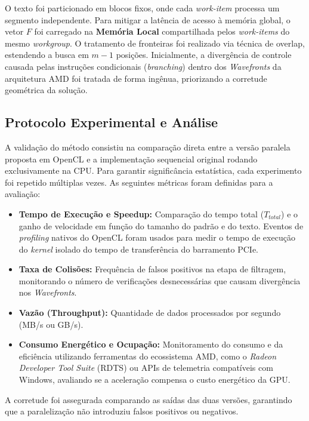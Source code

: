 \documentclass[12pt]{article}
\begin{document}
O texto foi particionado em blocos fixos, onde cada \textit{work-item} processa um segmento independente. Para mitigar a latência de acesso à memória global, o vetor $F$ foi carregado na \textbf{Memória Local} compartilhada pelos \textit{work-items} do mesmo \textit{workgroup}. O tratamento de fronteiras foi realizado via técnica de overlap, estendendo a busca em $m-1$ posições. Inicialmente, a divergência de controle causada pelas instruções condicionais (\textit{branching}) dentro dos \textit{Wavefronts} da arquitetura AMD foi tratada de forma ingênua, priorizando a corretude geométrica da solução.

\subsection{Protocolo Experimental e Análise}

A validação do método consistiu na comparação direta entre a versão paralela proposta em OpenCL e a implementação sequencial original rodando exclusivamente na CPU. Para garantir significância estatística, cada experimento foi repetido múltiplas vezes. As seguintes métricas foram definidas para a avaliação:

\begin{itemize}
    \item \textbf{Tempo de Execução e Speedup:} Comparação do tempo total ($T_{total}$) e o ganho de velocidade em função do tamanho do padrão e do texto. Eventos de \textit{profiling} nativos do OpenCL foram usados para medir o tempo de execução do \textit{kernel} isolado do tempo de transferência do barramento PCIe.
    \item \textbf{Taxa de Colisões:} Frequência de falsos positivos na etapa de filtragem, monitorando o número de verificações desnecessárias que causam divergência nos \textit{Wavefronts}.
    \item \textbf{Vazão (Throughput):} Quantidade de dados processados por segundo (MB/s ou GB/s).
    \item \textbf{Consumo Energético e Ocupação:} Monitoramento do consumo e da eficiência utilizando ferramentas do ecossistema AMD, como o \textit{Radeon Developer Tool Suite} (RDTS) ou APIs de telemetria compatíveis com Windows, avaliando se a aceleração compensa o custo energético da GPU.
\end{itemize}

A corretude foi assegurada comparando as saídas das duas versões, garantindo que a paralelização não introduziu falsos positivos ou negativos.
\end{document}

